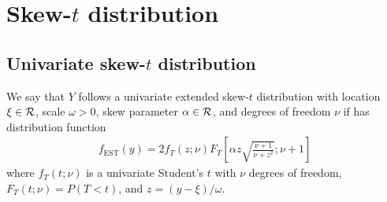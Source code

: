 \documentclass[useAMS,usenatbib,referee]{biomweb}
\providecommand{\DIFaddbegin}{} %
\providecommand{\DIFaddend}{} %
\providecommand{\DIFdelbegin}{} %
\providecommand{\DIFdelend}{} %
\begin{document}

\section{Skew-$t$ distribution} \DIFdelbegin %
\DIFdelend \DIFaddbegin \label{sta:skewt}
\DIFaddend \subsection*{Univariate skew-$t$ distribution}
We say that $Y$ follows a univariate extended skew-$t$ distribution with location $\xi \in \calR$, scale $\omega > 0$, skew parameter $\alpha \in \calR$, and degrees of freedom $\nu$ if has distribution function
\begin{align}
  f_{\text{EST}}(y) = 2 f_T (z; \nu) F_T\left[ \alpha z \sqrt{ \frac{ \nu + 1 }{ \nu + z^2}}; \nu + 1 \right]
\end{align}
where $f_T(t; \nu)$ is a univariate Student's $t$ with $\nu$ degrees of freedom, $F_T(t; \nu) = P(T < t)$, and \hbox{$z = (y - \xi) / \omega$}.
\end{document}
